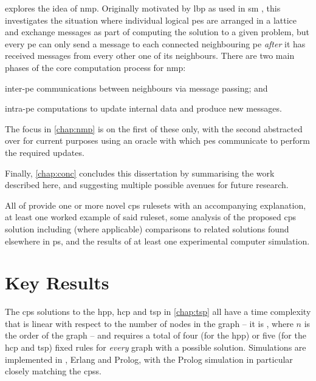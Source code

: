  explores the idea of \gls{nmp}.  Originally motivated by \gls{lbp} \cite{Sun2003,Felzenszwalb2006,Felzenszwalb2011} as used in \gls{sm} \cite{Sinha2020,Tippetts2016,Scharstein2002}, this  investigates the situation where individual logical \glspl{pe} are arranged in a lattice and exchange messages as part of computing the solution to a given problem, but every \gls{pe} can only send a message to each connected neighbouring \gls{pe} \emph{after} it has received messages from every other one of its neighbours.  There are two main phases of the core computation process for \gls{nmp}:
\begin{inparaenum}[a)]
\item inter-\gls{pe} communications between neighbours via message passing; and
\item intra-\gls{pe} computations to update internal data and produce new messages.
\end{inparaenum}  The focus in \cref{chap:nmp} is on the first of these only, with the second abstracted over for current purposes using an oracle with which \glspl{pe} communicate to perform the required updates.

Finally, \cref{chap:conc} concludes this dissertation by summarising the work described here, and suggesting multiple possible avenues for future research.

All of  provide one or more novel \gls{cps} \glspl{ruleset} with an accompanying explanation, at least one worked example of said \gls{ruleset}, some analysis of the proposed \gls{cps} solution including (where applicable) comparisons to related solutions found elsewhere in \gls{ps}, and the results of at least one experimental computer simulation.

\section{Key Results}

The \gls{cps} solutions to the \gls{hpp}, \gls{hcp} and \gls{tsp} in \cref{chap:tsp} all have a time complexity that is linear with respect to the number of nodes in the graph -- \ie{} it is , where \(n\) is the order of the graph -- and requires a total of four (for the \gls{hpp}) or five (for the \gls{hcp} and \gls{tsp}) fixed rules for \emph{every} graph with a possible solution.  Simulations are implemented in \fsharp{}, Erlang and Prolog, with the Prolog simulation in particular closely matching the \glspl{cps}.

